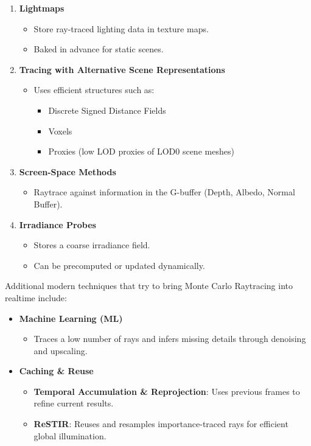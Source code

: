 \documentclass[sigconf, nonacm]{acmart}
\begin{document}
\begin{enumerate}
    \item \textbf{Lightmaps}
    \begin{itemize}
        \item Store ray-traced lighting data in texture maps.
        \item Baked in advance for static scenes.
    \end{itemize}
    
    \item \textbf{Tracing with Alternative Scene Representations}
    \begin{itemize}
        \item Uses efficient structures such as:
        \begin{itemize}
            \item Discrete Signed Distance Fields
            \item Voxels 
            \item Proxies (low LOD proxies of LOD0 scene meshes)
        \end{itemize}
    \end{itemize}
    
    \item \textbf{Screen-Space Methods}
    \begin{itemize}
        \item Raytrace against information in the G-buffer (Depth, Albedo, Normal Buffer). 
    \end{itemize}
    
    \item \textbf{Irradiance Probes}
    \begin{itemize}
        \item Stores a coarse irradiance field.
        \item Can be precomputed or updated dynamically.
    \end{itemize}
\end{enumerate}

Additional modern techniques that try to bring Monte Carlo Raytracing into realtime include:

\begin{itemize}
    \item \textbf{Machine Learning (ML)}
    \begin{itemize}
        \item Traces a low number of rays and infers missing details through denoising and upscaling.
    \end{itemize}
    
    \item \textbf{Caching \& Reuse}
    \begin{itemize}
        \item \textbf{Temporal Accumulation \& Reprojection}: Uses previous frames to refine current results.
        \item \textbf{ReSTIR}: Reuses and resamples importance-traced rays for efficient global illumination.
    \end{itemize}
\end{itemize}
\end{document}
